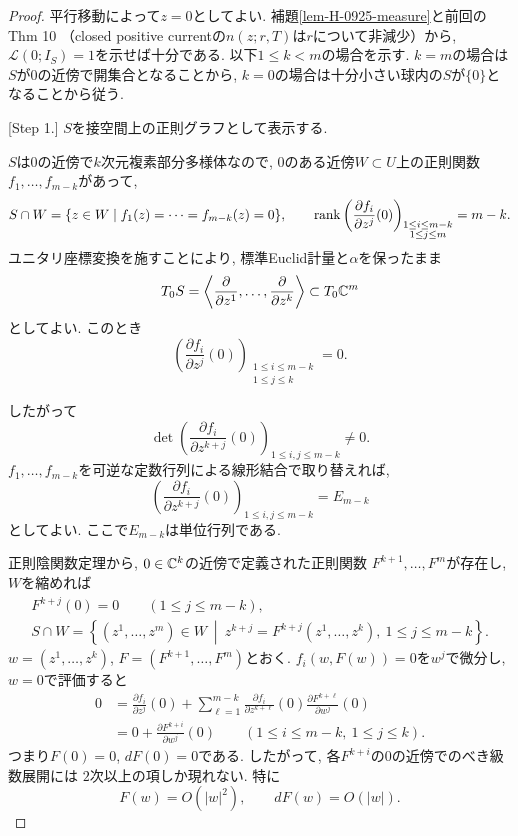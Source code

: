 \begin{proof}
平行移動によって$z=0$としてよい.
補題\ref{lem-H-0925-measure}と前回のThm 10
（closed positive currentの$n(z;r,T)$は$r$について非減少）から,
$\mathcal{L}(0;I_S)=1$を示せば十分である.
以下$1\leq k<m$の場合を示す.
$k=m$の場合は$S$が$0$の近傍で開集合となることから,
$k=0$の場合は十分小さい球内の$S$が$\{0\}$となることから従う.

[Step 1.] $S$を接空間上の正則グラフとして表示する.

$S$は$0$の近傍で$k$次元複素部分多様体なので,
$0$のある近傍$W\subset U$上の正則関数
$f_1,\ldots,f_{m-k}$があって,
\begin{equation*}
S\cap W=\{z\in W\mid f_1(z)=\cdots=f_{m-k}(z)=0\},
\qquad
\operatorname{rank}\left(\frac{\partial f_i}{\partial z^j}(0)\right)
_{\substack{1\leq i\leq m-k\\1\leq j\leq m}}=m-k.
\end{equation*}
ユニタリ座標変換を施すことにより,
標準Euclid計量と$\alpha$を保ったまま
\begin{equation*}
T_0S
=\left\langle\frac{\partial}{\partial z^1},\ldots,
\frac{\partial}{\partial z^k}\right\rangle
\subset T_0\mathbb{C}^m
\end{equation*}
としてよい. このとき
\begin{equation*}
\left(\frac{\partial f_i}{\partial z^j}(0)\right)
_{\substack{1\leq i\leq m-k\\1\leq j\leq k}}=0.
\end{equation*}

したがって
\begin{equation*}
\det\left(\frac{\partial f_i}{\partial z^{k+j}}(0)\right)
_{1\leq i,j\leq m-k}\neq0.
\end{equation*}
$f_1,\ldots,f_{m-k}$を可逆な定数行列による線形結合で取り替えれば,
\begin{equation*}
\left(\frac{\partial f_i}{\partial z^{k+j}}(0)\right)
_{1\leq i,j\leq m-k}=E_{m-k}
\end{equation*}
としてよい. ここで$E_{m-k}$は単位行列である.

正則陰関数定理から, $0\in\mathbb{C}^k$の近傍で定義された正則関数
$F^{k+1},\ldots,F^m$が存在し, $W$を縮めれば
\begin{gather*}
F^{k+j}(0)=0\qquad(1\leq j\leq m-k),\\
S\cap W
=\left\{(z^1,\ldots,z^m)\in W\ \middle|\
z^{k+j}=F^{k+j}(z^1,\ldots,z^k),\ 1\leq j\leq m-k\right\}.
\end{gather*}
$w=(z^1,\ldots,z^k)$, $F=(F^{k+1},\ldots,F^m)$とおく.
$f_i(w,F(w))=0$を$w^j$で微分し, $w=0$で評価すると
\begin{align*}
0
&=\frac{\partial f_i}{\partial z^j}(0)
+\sum_{\ell=1}^{m-k}
\frac{\partial f_i}{\partial z^{k+\ell}}(0)
\frac{\partial F^{k+\ell}}{\partial w^j}(0)\\
&=0+\frac{\partial F^{k+i}}{\partial w^j}(0)
\qquad(1\leq i\leq m-k,\ 1\leq j\leq k).
\end{align*}
つまり$F(0)=0$, $dF(0)=0$である.
したがって, 各$F^{k+i}$の$0$の近傍でのべき級数展開には
$2$次以上の項しか現れない. 特に
\begin{equation*}
F(w)=O(|w|^2),\qquad dF(w)=O(|w|).
\end{equation*}


\end{proof}
